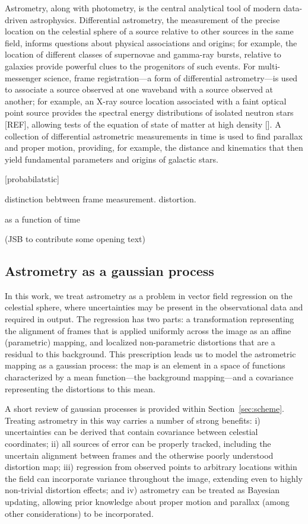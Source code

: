 \documentclass[manuscript]{aastex}
\begin{document}
Astrometry, along with photometry, is the central analytical tool of modern data-driven astrophysics. Differential astrometry, the measurement of the precise location on the celestial sphere of a source relative to other sources in the same field, informs questions about  physical associations and origins; for example, the location of different classes of supernovae and gamma-ray bursts, relative to galaxies provide powerful clues to the progenitors of such events. For multi-messenger science, frame registration---a form of differential astrometry---is used to associate a source observed at one waveband with a source observed at another; for example, an X-ray source location associated with a faint optical point source provides the spectral energy distributions of isolated neutron stars [REF], allowing tests of the equation of state of matter at high density []. A collection of differential astrometric measurements in time is used to find parallax and proper motion, providing, for example, the distance and kinematics that then yield fundamental parameters and origins of galactic stars. 

[probabilatstic]

distinction bebtween frame measurement. distortion.

 as a function of time

(JSB to contribute some opening text)

\subsection{Astrometry as a gaussian process}
In this work, we treat astrometry as a problem in vector field regression on the celestial sphere, where uncertainties may be present in the observational data and required in output. The regression has two parts: a transformation representing the alignment of frames that is applied uniformly across the image as an affine (parametric) mapping, and localized non-parametric distortions that are a residual to this background. This prescription leads us to model the astrometric mapping as a gaussian process: the map is an element in a space of functions characterized by a mean function---the background mapping---and a covariance representing the distortions to this mean. 

A short review of gaussian processes is provided within Section~\ref{sec:scheme}. Treating astrometry in this way carries a number of strong benefits: i) uncertainties can be derived that contain covariance between celestial coordinates; ii) all sources of error can be properly tracked, including the uncertain alignment between frames and the otherwise poorly understood distortion map; iii) regression from observed points to arbitrary locations within the field can incorporate variance throughout the image, extending even to highly non-trivial distortion effects; and iv) astrometry can be treated as Bayesian updating, allowing prior knowledge about proper motion and parallax (among other considerations) to be incorporated.
\end{document}

